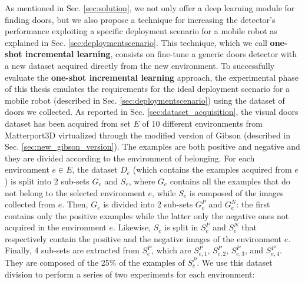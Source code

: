 As mentioned in Sec. \ref{sec:solution}, we not only offer a deep learning module for finding doors, but we also propose a technique for increasing the detector's performance exploiting a specific deployment scenario for a mobile robot as  explained in Sec. \ref{sec:deploymentscenario}. This technique, which we call \textbf{one-shot incremental learning}, consists on fine-tune a generic doors detector with a new dataset acquired directly from the new environment.
To successfully evaluate the \textbf{one-shot incremental learning} approach, the experimental phase of this thesis emulates the requirements for the ideal deployment scenario for a mobile robot (described in Sec. \ref{sec:deploymentscenario}) using the dataset of doors we collected. As reported in Sec. \ref{sec:dataset_acquisition}, the visual doors dataset has been acquired from set $E$ of 10 different environments from Matterport3D \cite{matterport} virtualized through the modified version of Gibson \cite{gibson} (described in Sec. \ref{sec:new_gibson_version}). The examples are both positive and negative and they are divided according to the environment of belonging. For each environment $e \in E$, the dataset $D_{e}$ (which contains the examples acquired from $e$) is split into 2 sub-sets $G_e$ and $S_e$, where $G_e$ contains all the examples that do not belong to the selected environment $e$, while $S_e$ is composed of the images collected from $e$. Then, $G_e$ is divided into 2 sub-sets $G^{P}_e$ and $G^{N}_e$: the first contains only the positive examples while the latter only the negative ones not acquired in the environment $e$. Likewise, $S_e$ is split in $S^{P}_e$ and $S^{N}_e$ that respectively contain the positive and the negative images of the environment $e$. Finally, 4 sub-sets are extracted from $S^{P}_e$, which are $S^{P}_{e, 1}$, $S^{P}_{e, 2}$, $S^{P}_{e, 3}$, and $S^{P}_{e, 4} $. They are composed of the 25\% of the examples of $S^{P}_e$. We use this dataset division to perform a series of two experiments for each environment:


